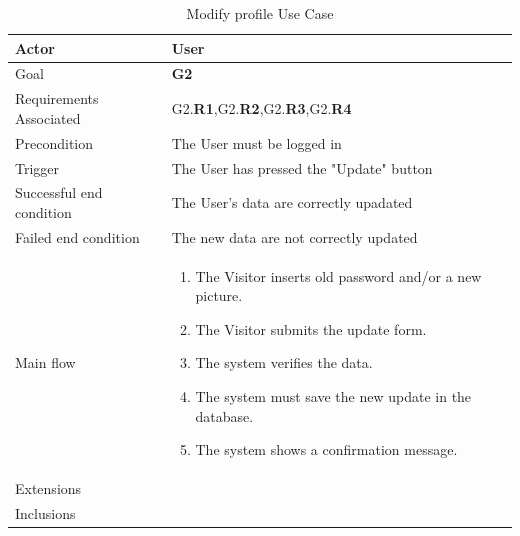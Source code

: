 \newline
\begin{table}[htb]
\begin{center}
\renewcommand{\arraystretch}{1.5}
\begin{tabular}{|l|p{}|}
\hline
Actor & User \\ \hline
Goal & \textbf{G2} \\ \hline
Requirements Associated & G2.\textbf{R1},G2.\textbf{R2},G2.\textbf{R3},G2.\textbf{R4} \\ \hline
Precondition & The User must be logged in \\ \hline
Trigger & The User has pressed the "Update" button \\ \hline
Successful end condition & The User's data are correctly upadated \\ \hline
Failed end condition & The new data are not correctly updated \\ \hline
Main flow & \begin{minipage}[t]{0.6\textwidth}
\begin{enumerate}
\addtolength{\itemindent}{0.5cm}
\item The Visitor inserts old password and/or a new picture.
\item The Visitor submits the update form.
\item The system verifies the data.
\item The system must save the new update in the database.
\item The system shows a confirmation message.
\end{enumerate}
\end{minipage} \\ \hline
Extensions & \\ \hline
Inclusions &  \\ \hline
\end{tabular}
\caption{Modify profile Use Case}
\end{center}
\end{table}
\clearpage

